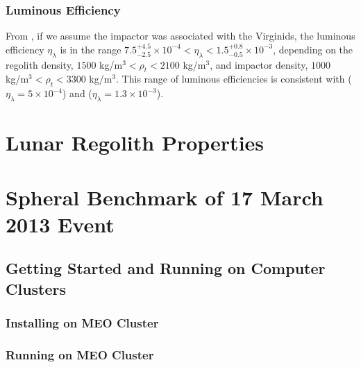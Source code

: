 \documentclass{hitec}
\numberwithin{equation}{section}
\begin{document}
\subsubsection{Luminous Efficiency}

From \cite{moser2014large}, if we assume the impactor was associated with the Virginids, the luminous efficiency $\eta_\lambda$ is in the range $7.5_{-2.5}^{+4.5} \times 10^{-4} < \eta_\lambda < 1.5_{-0.5}^{+0.8} \times 10^{-3}$, depending on the regolith density, $1500$ kg/m$^3 < \rho_t < 2100$ kg/m$^3$, and impactor density, $1000$ kg/m$^3 < \rho_t < 3300$ kg/m$^3$. This range of luminous efficiencies is consistent with \cite{bouley2012power} ($\eta_\lambda = 5\times 10^{-4}$) and \cite{moser2011luminous} ($\eta_\lambda = 1.3\times 10^{-3}$).

\section{Lunar Regolith Properties}



\section{Spheral Benchmark of 17 March 2013 Event}
\subsection{Getting Started and Running on Computer Clusters}
\subsubsection{Installing on MEO Cluster}



\subsubsection{Running on MEO Cluster}
\end{document}
